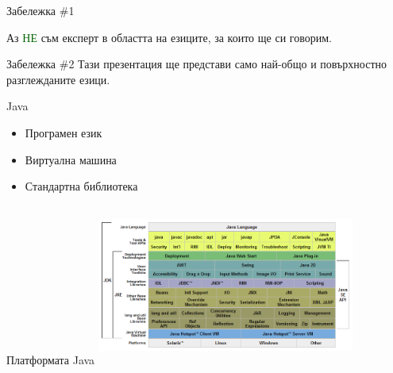 \documentclass[compress,red]{beamer}
\begin{document}

\begin{frame}
  \begin{center}
    \begin{block}{Забележка \#1}
      \vspace{.1cm}
      \begin{center} \large
	Аз \textcolor{darkgreen}{НЕ} съм експерт в областта на
        езиците, за които ще си говорим.\\ \vspace{.1cm}
      \end{center}
    \end{block}
    \vspace{1cm}
    \begin{block}{Забележка \#2}
      \vspace{.1cm}
      Тази презентация ще представи само най-общо и повърхностно разглежданите езици.\\ \vspace{.1cm}
    \end{block}
  \end{center}
\end{frame}

\begin{frame}{Java}
  \transdissolve
  \begin{itemize}
  \item Програмен език \pause
  \item Виртуална машина \pause
  \item Стандартна библиотека
  \end{itemize}
\end{frame}

\begin{frame}{Платформата Java}
  \transdissolve
  \includegraphics[height=200px, width=320px]{images/JavaPlatform.png}
\end{frame}
\end{document}
